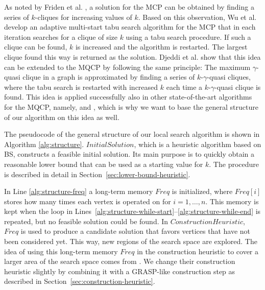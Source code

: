 \documentclass[draft,final]{vutinfth} %
\begin{document}
As noted by Friden et al. \cite{Friden1989}, a solution for the MCP can be obtained by finding a series of $k$-cliques for increasing values of $k$. Based on this observation, Wu et al. \cite{WuH13} develop an adaptive multi-start tabu search algorithm for the MCP that in each iteration searches for a clique of size $k$ using a tabu search procedure. If such a clique can be found, $k$ is increased and the algorithm is restarted. The largest clique found this way is returned as the solution. Djeddi et al. \cite{djeddi_extension_2019} show that this idea can be extended to the MQCP by following the same principle: The maximum $\gamma$-quasi clique in a graph is approximated by finding a series of $k$-$\gamma$-quasi cliques, where the tabu search is restarted with increased $k$ each time a $k$-$\gamma$-quasi clique is found. This idea is applied successfully also in other state-of-the-art algorithms for the MQCP, namely, \cite{zhou_opposition-based_2020} and \cite{chen_nuqclq_2021}, which is why we want to base the general structure of our algorithm on this idea as well. 

The pseudocode of the general structure of our local search algorithm is shown in Algorithm \ref{alg:structure}.
$\mathit{InitialSolution}$, which is a heuristic algorithm based on BS, constructs a feasible initial solution. Its main purpose is to quickly obtain a reasonable lower bound that can be used as a starting value for $k$. The procedure is described in detail in Section~\ref{sec:lower-bound-heuristic}.

In Line \ref{alg:structure-freq} a long-term memory $\mathit{Freq}$ is initialized, where $\mathit{Freq[i]}$ stores how many times each vertex is operated on for $i=1,\dots,n$. This memory is kept when the loop in Lines~\ref{alg:structure-while-start}--\ref{alg:structure-while-end} is repeated, but no feasible solution could be found. In $\mathit{ConstructionHeuristic}$, $\mathit{Freq}$ is used to produce a candidate solution that favors vertices that have not been considered yet. This way, new regions of the search space are explored. The idea of using this long-term memory $\mathit{Freq}$ in the construction heuristic to cover a larger area of the search space comes from \cite{chen_nuqclq_2021}. We change their construction heuristic slightly by combining it with a GRASP-like construction step as described in Section~\ref{sec:construction-heuristic}. 
\end{document}
